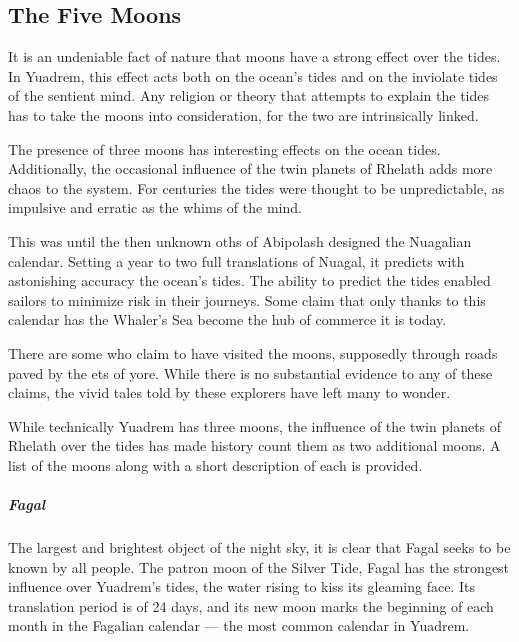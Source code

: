 \subsection*{The Five Moons}


It is an undeniable fact of nature that moons have a strong effect over the tides.
In Yuadrem, this effect acts both on the ocean's tides and on the inviolate tides of the sentient mind.
Any religion or theory that attempts to explain the tides has to take the moons into consideration, for the two are intrinsically linked.

The presence of three moons has interesting effects on the ocean tides.
Additionally, the occasional influence of the twin planets of Rhelath adds more chaos to the system.
For centuries the tides were thought to be unpredictable, as impulsive and erratic as the whims of the mind.

This was until the then unknown oths of Abipolash designed the Nuagalian calendar.
Setting a year to two full translations of Nuagal, it predicts with astonishing accuracy the ocean's tides.
The ability to predict the tides enabled sailors to minimize risk in their journeys.
Some claim that only thanks to this calendar has the Whaler's Sea become the hub of commerce it is today.

There are some who claim to have visited the moons, supposedly through roads paved by the ets of yore.
While there is no substantial evidence to any of these claims, the vivid tales told by these explorers have left many to wonder.

While technically Yuadrem has three moons, the influence of the twin planets of Rhelath over the tides has made history count them as two additional moons.
A list of the moons along with a short description of each is provided.

\subparagraph{Fagal} The largest and brightest object of the night sky, it is clear that Fagal seeks to be known by all people.
The patron moon of the Silver Tide, Fagal has the strongest influence over Yuadrem's tides, the water rising to kiss its gleaming face.
Its translation period is of 24 days, and its new moon marks the beginning of each month in the Fagalian calendar --- the most common calendar in Yuadrem.

